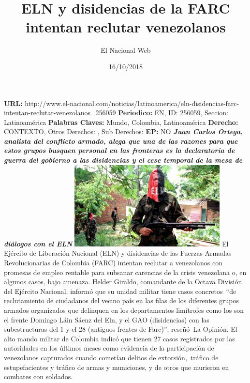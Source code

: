 \documentclass{article}%
\title{\textbf{ELN y disidencias de la FARC intentan reclutar venezolanos}}%
\author{El Nacional Web}%
\date{16/10/2018}%
\begin{document}
%
\normalsize%
\maketitle%
\textbf{URL: }%
http://www.el{-}nacional.com/noticias/latinoamerica/eln{-}disidencias{-}farc{-}intentan{-}reclutar{-}venezolanos\_256059\newline%
%
\textbf{Periodico: }%
EN, %
ID: %
256059, %
Seccion: %
Latinoamérica\newline%
%
\textbf{Palabras Claves: }%
Mundo, Colombia, Latinoamérica\newline%
%
\textbf{Derecho: }%
CONTEXTO, %
Otros Derechos: %
, %
Sub Derechos: %
\newline%
%
\textbf{EP: }%
NO\newline%
\newline%
%
\textbf{\textit{Juan Carlos Ortega, analista del conflicto armado, alega que una de las razones para que estos grupos busquen personal en las fronteras es la declaratoria de guerra del gobierno a las disidencias y el cese temporal de la mesa de diálogos con el ELN}}%
\newline%
\newline%
%
\includegraphics[width=300px]{177.jpg}%
\newline%
%
El Ejército de Liberación Nacional (ELN) y disidencias de las Fuerzas Armadas Revolucionarias de Colombia (FARC) intentan reclutar a venezolanos con promesas de empleo rentable para subsanar carencias de la crisis venezolana o, en algunos casos, bajo amenaza.%
\newline%
%
Helder Giraldo, comandante de la Octava División del Ejército Nacional, informó que su unidad militar tiene casos concretos~“de reclutamiento de ciudadanos del vecino país en las filas de los diferentes grupos armados organizados que delinquen en los departamentos limítrofes como los son el frente Domingo Láin Sáenz del Eln, y el GAO (disidencias) con las subestructuras del 1 y el 28 (antiguos frentes de Farc)”, reseñó~La Opinión.%
\newline%
%
El alto mando militar de Colombia indicó que tienen 27 casos registrados por las autoridades en los últimos meses como evidencia de la participación de venezolanos capturados cuando cometían delitos de extorsión,~tráfico de estupefacientes y tráfico de armas y municiones, y de otros que murieron en combates con soldados.%
\end{document}

